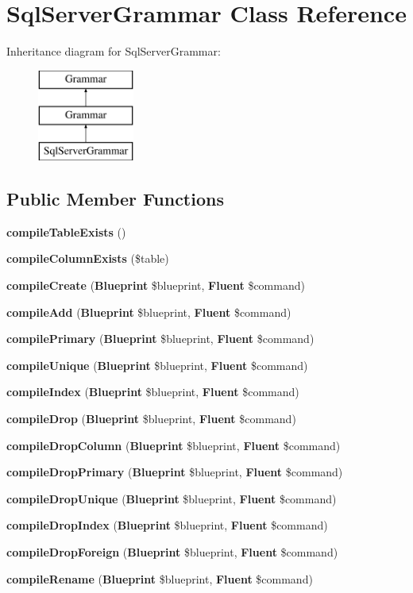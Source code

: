 \section{Sql\+Server\+Grammar Class Reference}
\label{class_illuminate_1_1_database_1_1_schema_1_1_grammars_1_1_sql_server_grammar}
Inheritance diagram for Sql\+Server\+Grammar\+:\begin{figure}[H]
\begin{center}
\leavevmode
\includegraphics[height=3.000000cm]{class_illuminate_1_1_database_1_1_schema_1_1_grammars_1_1_sql_server_grammar}
\end{center}
\end{figure}
\subsection*{Public Member Functions}
\begin{DoxyCompactItemize}
\item 
{\bf compile\+Table\+Exists} ()
\item 
{\bf compile\+Column\+Exists} (\$table)
\item 
{\bf compile\+Create} ({\bf Blueprint} \$blueprint, {\bf Fluent} \$command)
\item 
{\bf compile\+Add} ({\bf Blueprint} \$blueprint, {\bf Fluent} \$command)
\item 
{\bf compile\+Primary} ({\bf Blueprint} \$blueprint, {\bf Fluent} \$command)
\item 
{\bf compile\+Unique} ({\bf Blueprint} \$blueprint, {\bf Fluent} \$command)
\item 
{\bf compile\+Index} ({\bf Blueprint} \$blueprint, {\bf Fluent} \$command)
\item 
{\bf compile\+Drop} ({\bf Blueprint} \$blueprint, {\bf Fluent} \$command)
\item 
{\bf compile\+Drop\+Column} ({\bf Blueprint} \$blueprint, {\bf Fluent} \$command)
\item 
{\bf compile\+Drop\+Primary} ({\bf Blueprint} \$blueprint, {\bf Fluent} \$command)
\item 
{\bf compile\+Drop\+Unique} ({\bf Blueprint} \$blueprint, {\bf Fluent} \$command)
\item 
{\bf compile\+Drop\+Index} ({\bf Blueprint} \$blueprint, {\bf Fluent} \$command)
\item 
{\bf compile\+Drop\+Foreign} ({\bf Blueprint} \$blueprint, {\bf Fluent} \$command)
\item 
{\bf compile\+Rename} ({\bf Blueprint} \$blueprint, {\bf Fluent} \$command)
\end{DoxyCompactItemize}

